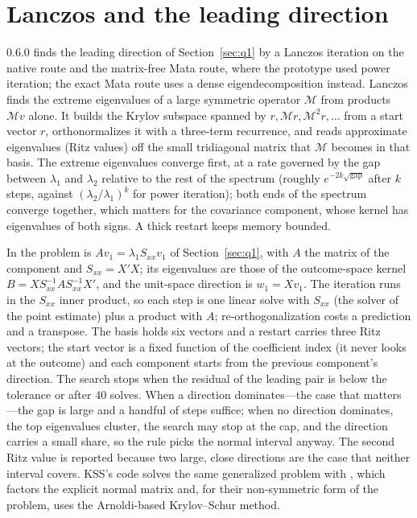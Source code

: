 \section{Lanczos and the leading direction}\label{kss:app:lanczos}

\fevc{} 0.6.0 finds the leading direction of Section~\ref{sec:q1} by a Lanczos iteration on the native route and
the matrix-free Mata route, where the prototype used power iteration; the exact Mata route uses a dense
eigendecomposition instead. Lanczos finds the extreme eigenvalues of a large symmetric operator $\mathcal M$ from products
$\mathcal Mv$ alone. It builds the Krylov subspace spanned by $r,\mathcal Mr,\mathcal M^2r,\dots$ from a start
vector $r$, orthonormalizes it with a three-term recurrence, and reads approximate eigenvalues (Ritz values) off
the small tridiagonal matrix that $\mathcal M$ becomes in that basis. The extreme eigenvalues converge first, at
a rate governed by the gap between $\lambda_1$ and $\lambda_2$ relative to the rest of the spectrum (roughly
$e^{-2k\sqrt{\mathrm{gap}}}$ after $k$ steps, against $(\lambda_2/\lambda_1)^k$ for power iteration); both ends of
the spectrum converge together, which matters for the covariance component, whose kernel has eigenvalues of both
signs. A thick restart keeps memory bounded.

In \fevc{} the problem is $Av_1=\lambda_1S_{xx}v_1$ of Section~\ref{sec:q1}, with $A$ the matrix of the component
and $S_{xx}=X'X$; its eigenvalues are those of the outcome-space kernel $B=XS_{xx}^{-1}AS_{xx}^{-1}X'$, and the
unit-space direction is $w_1=Xv_1$. The iteration runs in the $S_{xx}$ inner product, so each step is one linear
solve with $S_{xx}$ (the solver of the point estimate) plus a product with $A$; re-orthogonalization costs a
prediction and a transpose. The basis holds six vectors and a restart carries three Ritz vectors; the start vector
is a fixed function of the coefficient index (it never looks at the outcome) and each component starts from the
previous component's direction. The search stops when the residual of the leading pair is below the tolerance or
after 40 solves. When a direction dominates---the case that matters---the gap is large and a handful of steps
suffice; when no direction dominates, the top eigenvalues cluster, the search may stop at the cap, and the
direction carries a small share, so the rule picks the normal interval anyway. The second Ritz value is reported
because two large, close directions are the case that neither interval covers. KSS's code solves the same
generalized problem with , which factors the explicit normal matrix and, for their non-symmetric form of
the problem, uses the Arnoldi-based Krylov--Schur method.
